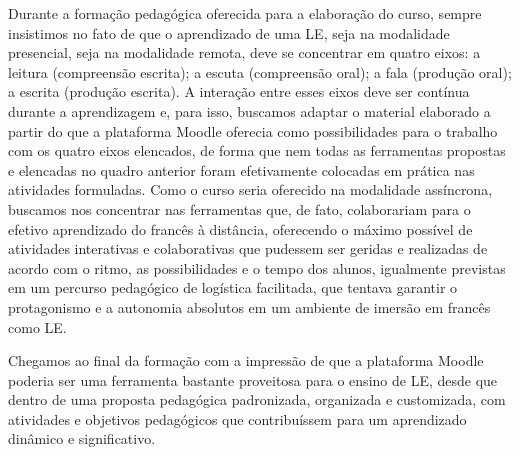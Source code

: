 Durante a formação pedagógica oferecida para a elaboração do curso,
sempre insistimos no fato de que o aprendizado de uma LE, seja na
modalidade presencial, seja na modalidade remota, deve se concentrar em
quatro eixos: a leitura (compreensão escrita); a escuta (compreensão
oral); a fala (produção oral); a escrita (produção escrita). A interação
entre esses eixos deve ser contínua durante a aprendizagem e, para isso,
buscamos adaptar o material elaborado a partir do que a plataforma
Moodle oferecia como possibilidades para o trabalho com os quatro eixos
elencados, de forma que nem todas as ferramentas propostas e elencadas
no quadro anterior foram efetivamente colocadas em prática nas
atividades formuladas. Como o curso seria oferecido na modalidade
assíncrona, buscamos nos concentrar nas ferramentas que, de fato,
colaborariam para o efetivo aprendizado do francês à distância,
oferecendo o máximo possível de atividades interativas e colaborativas
que pudessem ser geridas e realizadas de acordo com o ritmo, as
possibilidades e o tempo dos alunos, igualmente previstas em um percurso
pedagógico de logística facilitada, que tentava garantir o protagonismo
e a autonomia absolutos em um ambiente de imersão em francês como LE.

Chegamos ao final da formação com a impressão de que a plataforma Moodle
poderia ser uma ferramenta bastante proveitosa para o ensino de LE,
desde que dentro de uma proposta pedagógica padronizada, organizada e
customizada, com atividades e objetivos pedagógicos que contribuíssem
para um aprendizado dinâmico e significativo.
